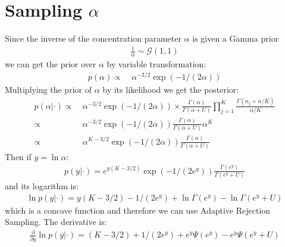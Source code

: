 \documentclass[smallextended]{svjour3}          %
\begin{document}
\section{Sampling $\alpha$}
Since the inverse of the concentration parameter $\alpha$ is given a Gamma prior
\begin{align*}
	\frac{1}{\alpha} \sim \mathcal{G}(1,1)
\end{align*}
we can get the prior over $\alpha$ by variable transformation:
\begin{align*}
p(\alpha) 
\propto~& 
\alpha^{-3/2} \exp \left(-1/(2\alpha)\right)
\end{align*}
Multiplying the prior of $\alpha$ by its likelihood we get the posterior:
\begin{align*}
	p(\alpha | \cdot) 
	\propto~& 
	\alpha^{-3/2} \exp \left(-1/(2\alpha)\right)
	\times
	\frac{\Gamma(\alpha)}{\Gamma(\alpha+U)}
	\prod_{j=1}^{K}
	\frac{\Gamma(n_j + \alpha/K)}{\alpha/K}\\
	\propto~& 
	\alpha^{-3/2} \exp \left(-1/(2\alpha)\right)
	\frac{\Gamma(\alpha)}{\Gamma(\alpha+U)}\alpha^K \\
	\propto~&\alpha^{K-3/2} \exp \left(-1/(2\alpha)\right)
	\frac{\Gamma(\alpha)}{\Gamma(\alpha+U)}
\end{align*}
Then if $y=\ln \alpha$:
\begin{align*}
p(y | \cdot) = e^{y(K-3/2)}
\exp(-1/(2e^y))
\frac{\Gamma(e^y)}{\Gamma(e^y +U)}
\end{align*}
and its logarithm is:
\begin{align*}
\ln p(y | \cdot) = 
y(K-3/2)
-1/(2e^y)+
\ln\Gamma(e^y) - \ln\Gamma(e^y+U)
\end{align*}
which is a concave function and therefore we can use Adaptive Rejection Sampling. The derivative is:
\begin{align*}
\frac{\partial}{\partial y} \ln p(y | \cdot) = 
(K-3/2)
+1/(2e^y)+
e^y\Psi(e^y) - e^y\Psi(e^y+U)
\end{align*}

 
% 
% 

\end{document}
